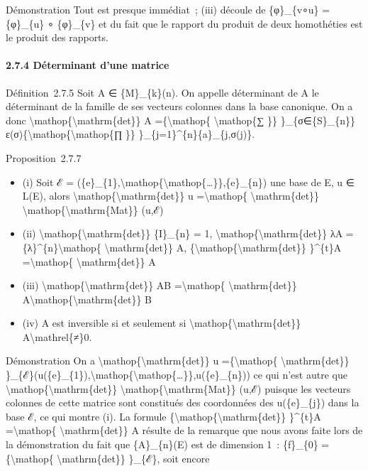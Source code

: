 \documentclass[]{article}
\begin{document}
Démonstration Tout est presque immédiat~; (iii) découle de
\{φ\}\_\{v∘u\} = \{φ\}\_\{u\} ∘ \{φ\}\_\{v\} et du fait que le rapport
du produit de deux homothéties est le produit des rapports.

\paragraph{2.7.4 Déterminant d'une matrice}

Définition~2.7.5 Soit A ∈ \{M\}\_\{k\}(n). On appelle déterminant de A
le déterminant de la famille de ses vecteurs colonnes dans la base
canonique. On a donc
\textbackslash{}mathop\{\textbackslash{}mathrm\{det\}\} A
=\{\textbackslash{}mathop\{ \textbackslash{}mathop\{∑ \}\}
\}\_\{σ∈\{S\}\_\{n\}\}ε(σ)\{\textbackslash{}mathop\{\textbackslash{}mathop\{∏
\}\} \}\_\{j=1\}\^{}\{n\}\{a\}\_\{j,σ(j)\}.

Proposition~2.7.7

\begin{itemize}
\itemsep1pt\parskip0pt
\item
  (i) Soit ℰ =
  (\{e\}\_\{1\},\textbackslash{}mathop\{\textbackslash{}mathop\{\ldots{}\}\},\{e\}\_\{n\})
  une base de E, u ∈ L(E), alors
  \textbackslash{}mathop\{\textbackslash{}mathrm\{det\}\} u
  =\textbackslash{}mathop\{ \textbackslash{}mathrm\{det\}\}
  \textbackslash{}mathop\{\textbackslash{}mathrm\{Mat\}\} (u,ℰ)
\item
  (ii) \textbackslash{}mathop\{\textbackslash{}mathrm\{det\}\}
  \{I\}\_\{n\} = 1,
  \textbackslash{}mathop\{\textbackslash{}mathrm\{det\}\} λA =
  \{λ\}\^{}\{n\}\textbackslash{}mathop\{ \textbackslash{}mathrm\{det\}\}
  A, \{\textbackslash{}mathop\{\textbackslash{}mathrm\{det\}\}
  \}\^{}\{t\}A =\textbackslash{}mathop\{ \textbackslash{}mathrm\{det\}\}
  A
\item
  (iii) \textbackslash{}mathop\{\textbackslash{}mathrm\{det\}\} AB
  =\textbackslash{}mathop\{ \textbackslash{}mathrm\{det\}\}
  A\textbackslash{}mathop\{\textbackslash{}mathrm\{det\}\} B
\item
  (iv) A est inversible si et seulement si
  \textbackslash{}mathop\{\textbackslash{}mathrm\{det\}\}
  A\textbackslash{}mathrel\{≠\}0.
\end{itemize}

Démonstration On a
\textbackslash{}mathop\{\textbackslash{}mathrm\{det\}\} u
=\{\textbackslash{}mathop\{ \textbackslash{}mathrm\{det\}\}
\}\_\{ℰ\}(u(\{e\}\_\{1\}),\textbackslash{}mathop\{\textbackslash{}mathop\{\ldots{}\}\},u(\{e\}\_\{n\}))
ce qui n'est autre que
\textbackslash{}mathop\{\textbackslash{}mathrm\{det\}\}
\textbackslash{}mathop\{\textbackslash{}mathrm\{Mat\}\} (u,ℰ) puisque
les vecteurs colonnes de cette matrice sont constitués des coordonnées
des u(\{e\}\_\{j\}) dans la base ℰ, ce qui montre (i). La formule
\{\textbackslash{}mathop\{\textbackslash{}mathrm\{det\}\} \}\^{}\{t\}A
=\textbackslash{}mathop\{ \textbackslash{}mathrm\{det\}\} A résulte de
la remarque que nous avons faite lors de la démonstration du fait que
\{A\}\_\{n\}(E) est de dimension 1~: \{f\}\_\{0\}
=\{\textbackslash{}mathop\{ \textbackslash{}mathrm\{det\}\} \}\_\{ℰ\},
soit encore
\end{document}
